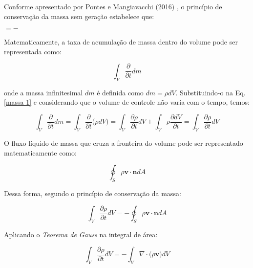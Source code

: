Conforme apresentado por Pontes e Mangiavacchi (2016) \cite{pontes2016}, o princípio
de conservação da massa sem geração estabelece que:

\medskip
\begin{center}
           $= -$ 
\end{center}

\newpage
Matematicamente, a taxa de acumulação de 
massa dentro do volume pode ser representada como:

\begin{equation} \label{massa 1} 
 \int_{V} \frac{\partial}{\partial t} dm
\end{equation}

\noindent onde a massa infinitesimal $dm$ é definida como
$dm = \rho dV$. Substituindo-o na Eq. \ref{massa 1} e considerando
que o volume de controle não varia com o tempo, temos:

\begin{equation}
 \int_{V} \frac{\partial}{\partial t} dm
 =
 \int_{V} \frac{\partial}{\partial t} \big( \rho dV \big)
 = 
 \int_{V} \frac{\partial \rho}{\partial t} dV
 +
 \int_{V} \rho \frac{\partial dV}{\partial t}
 = 
 \int_{V} \frac{\partial \rho}{\partial t} dV
\end{equation}

\medskip
O fluxo líquido de massa que cruza a fronteira do volume pode ser
representado matematicamente como:

\begin{equation}  
 \oint_{S} \rho \textbf{v} \cdot \textbf{n} dA
\end{equation}

\medskip
\noindent Dessa forma, segundo o princípio de conservação da massa:

\begin{equation}
 \int_{V} \frac{\partial \rho}{\partial t} dV
 = - 
 \oint_{S} \rho \textbf{v} \cdot \textbf{n} dA
\end{equation}

\medskip
\noindent Aplicando o \textit{Teorema de Gauss} na integral
de área:

\begin{equation}
 \int_{V} \frac{\partial \rho}{\partial t} dV
 = - 
 \int_{V} \nabla \cdot \big( \rho \textbf{v} \big) dV
\end{equation}


